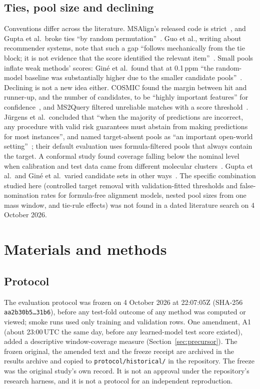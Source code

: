 \documentclass[11pt]{article}
\newcommand{\m}[1]{\texttt{#1}}
\begin{document}
\subsection{Ties, pool size and declining}\label{sec:related}
Conventions differ across the literature. MSAlign's released code is strict~\citep{msalign_readme}, and Gupta et al.\
broke ties ``by random permutation''~\citep{gupta2026spurious}. Guo et al., writing about recommender systems, note
that such a gap ``follows mechanically from the tie block; it is not evidence that the score identified the relevant
item''~\citep{guo2026ties}. Small pools inflate weak methods' scores: Gin\'e et al.\ found that at 0.1\,ppm ``the
random-model baseline was substantially higher due to the smaller candidate pools''~\citep{gine2026}. Declining is not
a new idea either. COSMIC found the margin between hit and runner-up, and the number of candidates, to be ``highly
important features'' for confidence~\citep{hoffmann2022cosmic}, and MS2Query filtered unreliable matches with a score
threshold~\citep{dejonge2023ms2query}. J\"urgens et al.\ concluded that ``when the majority of predictions are
incorrect, any procedure with valid risk guarantees must abstain from making predictions for most instances'', and
named target-absent pools as ``an important open-world setting''~\citep{jurgens2026}; their default evaluation uses
formula-filtered pools that always contain the target. A conformal study found coverage falling below the nominal
level when calibration and test data came from different molecular clusters~\citep{rakhshaninejad2026}. Gupta et al.\ and
Gin\'e et al.\ varied candidate sets in other ways~\citep{gupta2026spurious,gine2026}. The specific
combination studied here (controlled target removal with validation-fitted thresholds and false-nomination rates for
formula-free alignment models, nested pool sizes from one mass window, and tie-rule effects) was not found in a dated
literature search on 4 October 2026.

\section{Materials and methods}\label{sec:methods}

\subsection{Protocol}\label{sec:protocol}
The evaluation protocol was frozen on 4 October 2026 at 22:07:05Z (SHA-256 \m{aa2b30b5\ldots31b6}), before any
test-fold outcome of any method was computed or viewed; smoke runs used only training and validation rows. One
amendment, A1 (about 23:00\,UTC the same day, before any learned-model test score existed), added a descriptive
window-coverage measure (Section~\ref{sec:precursor}). The frozen original, the amended text and the freeze receipt
are archived in the results archive and copied to \m{protocol/historical/} in the repository. The freeze was the
original study's own record. It is not an approval under the repository's research harness, and it is not a protocol
for an independent reproduction.
\end{document}

